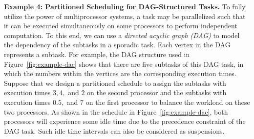 {\bf Example 4: Partitioned Scheduling for DAG-Structured Tasks.}
To fully utilize the power of multiprocessor systems, a task may be parallelized such that it can be executed simultaneously on some processors to perform independent computation. To this end, we can use a \emph{directed acyclic graph (DAG)} to model the dependency of the subtasks in a sporadic task. Each vertex in the DAG represents a subtask. For example, the DAG structure used in Figure~\ref{fig:example-dac} shows that there are five subtasks of this DAG task, in which the numbers within the vertices are the corresponding execution times. Suppose that we design a partitioned schedule to assign the subtasks with execution times $3,4,$ and $2$ on the second processor and the subtasks with execution times $0.5,$ and $7$ on the first processor to balance the workload on these two processors. As shown in the schedule in Figure~\ref{fig:example-dac}, both processors will experience some idle time 
due to the precedence constraint of the DAG task. Such idle time intervals can also be considered as suspensions. 




